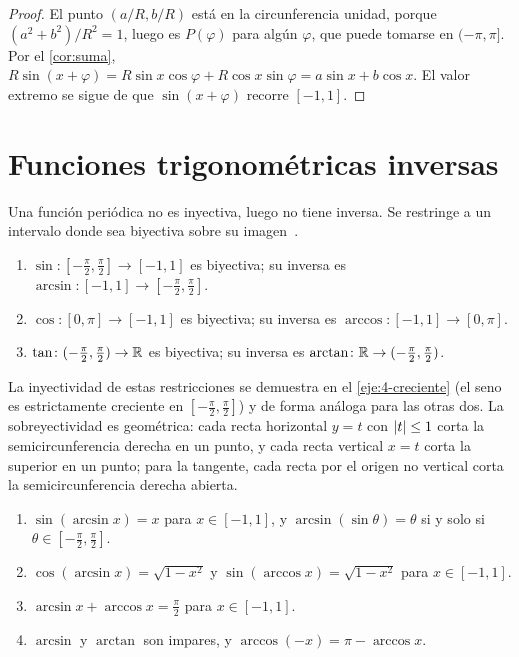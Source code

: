 \begin{proof}
El punto $(a/R,b/R)$ está en la circunferencia unidad, porque $(a^{2}+b^{2})/R^{2}=1$, luego es $P(\varphi)$ para algún $\varphi$, que puede tomarse en $(-\pi,\pi]$. Por el \cref{cor:suma}, $R\sin(x+\varphi)=R\sin x\cos\varphi+R\cos x\sin\varphi=a\sin x+b\cos x$. El valor extremo se sigue de que $\sin(x+\varphi)$ recorre $[-1,1]$.
\end{proof}

\section{Funciones trigonométricas inversas}

Una función periódica no es inyectiva, luego no tiene inversa. Se restringe a un intervalo donde sea biyectiva sobre su imagen~\cite[§8.3]{osat}.

\begin{definicion}\label{def:inversas}
\begin{enumerate}
  \item $\sin\colon[-\frac{\pi}{2},\frac{\pi}{2}]\to[-1,1]$ es biyectiva; su inversa es $\arcsin\colon[-1,1]\to[-\frac{\pi}{2},\frac{\pi}{2}]$.
  \item $\cos\colon[0,\pi]\to[-1,1]$ es biyectiva; su inversa es $\arccos\colon[-1,1]\to[0,\pi]$.
  \item $\tan\colon(-\frac{\pi}{2},\frac{\pi}{2})\to\mathbb{R}$ es biyectiva; su inversa es $\arctan\colon\mathbb{R}\to(-\frac{\pi}{2},\frac{\pi}{2})$.
\end{enumerate}
\end{definicion}

La inyectividad de estas restricciones se demuestra en el \cref{eje:4-creciente} (el seno es estrictamente creciente en $[-\frac{\pi}{2},\frac{\pi}{2}]$) y de forma análoga para las otras dos. La sobreyectividad es geométrica: cada recta horizontal $y=t$ con $\lvert t\rvert\le1$ corta la semicircunferencia derecha en un punto, y cada recta vertical $x=t$ corta la superior en un punto; para la tangente, cada recta por el origen no vertical corta la semicircunferencia derecha abierta.

\begin{proposicion}\label{prop:inversas}
\begin{enumerate}
  \item $\sin(\arcsin x)=x$ para $x\in[-1,1]$, y $\arcsin(\sin\theta)=\theta$ si y solo si $\theta\in[-\frac{\pi}{2},\frac{\pi}{2}]$.
  \item $\cos(\arcsin x)=\sqrt{1-x^{2}}$ y $\sin(\arccos x)=\sqrt{1-x^{2}}$ para $x\in[-1,1]$.
  \item $\arcsin x+\arccos x=\frac{\pi}{2}$ para $x\in[-1,1]$.
  \item $\arcsin$ y $\arctan$ son impares, y $\arccos(-x)=\pi-\arccos x$.
\end{enumerate}
\end{proposicion}

